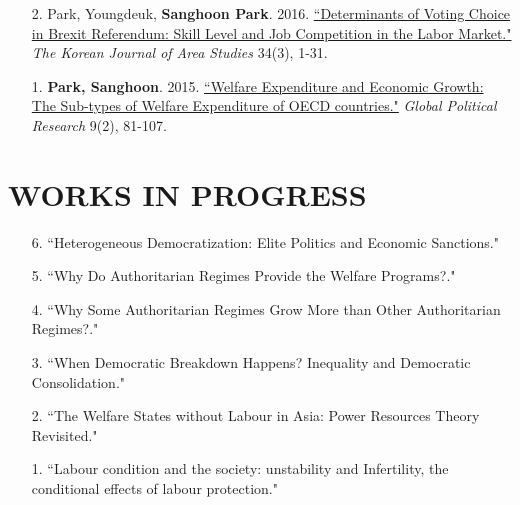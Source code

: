 \documentclass[11pt]{res} %
\begin{document}
\begin{resume}
\begin{enumerate}[leftmargin=*]
	\item[2.] Park, Youngdeuk, \textbf{Sanghoon Park}. 2016. \href{http://kiss.kstudy.com/thesis/thesis-view.asp?key=3472800}{``Determinants of Voting Choice in Brexit Referendum: Skill Level and Job Competition in the Labor Market."} \textit{The Korean Journal of Area Studies} 34(3), 1-31.	
	\item[1.] \textbf{Park, Sanghoon}. 2015. \href{http://search.koreanstudies.net/thesis/thesis-view.asp?key=3438155}{``Welfare Expenditure and Economic Growth: The Sub-types of Welfare Expenditure of OECD countries."} \textit{Global Political Research} 9(2), 81-107.	
\end{enumerate}

\section{WORKS IN PROGRESS}
\begin{enumerate}[leftmargin=*]
	\item[6.] ``Heterogeneous Democratization: 	Elite Politics and Economic Sanctions."
	\item[5.] ``Why Do Authoritarian Regimes Provide the Welfare Programs?."
	\item[4.] ``Why Some Authoritarian Regimes Grow More than Other Authoritarian Regimes?."
	\item[3.] ``When Democratic Breakdown Happens? Inequality and Democratic Consolidation."
	\item[2.] ``The Welfare States without Labour in Asia: Power Resources Theory Revisited."
	\item[1.] ``Labour condition and the society: unstability and Infertility, the conditional effects of labour protection."
\end{enumerate}


\end{resume}
\end{document}
